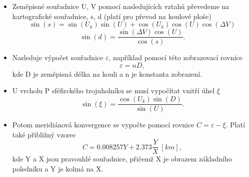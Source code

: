 \begin{itemize}
\item Zeměpisné souřadnice U, V pomocí nasledujících vztahů převedeme na kartografické souřadnice, s, d (platí pro převod na koulové ploše)
\begin{equation}
\sin{\left(s\right)} = \sin{\left(U_{k}\right)}\sin{\left(U\right)}+\cos{\left(U_{k}\right)}\cos{\left(U\right)}\cos{\left(\Delta V\right)}
\end{equation}
\begin{equation}
\sin{\left(d\right)}=\dfrac{\sin{\left(\Delta V\right)}\cos{\left(U\right)}}{\cos{\left(s\right)}}.
\end{equation}
\item Nasleduje výpočet souřadnice $\varepsilon$, například pomocí této zobrazovací rovnice
\begin{equation}
\varepsilon = nD,
\end{equation}
kde D je zeměpisná délka na kouli a n je konstanta zobrazení.
\item U vrcholu P sféfirckého trojuholníku se musí vypočítat vnitří úhel $\xi$
\begin{equation}
\sin{\left(\xi\right)} = \dfrac{\cos{\left(U_{k}\right)}\sin{\left(D\right)}}{\sin{\left(U\right)}}.
\end{equation}
\item Potom meridiánová konvergence se vypočte pomocí rovnice $C = \varepsilon - \xi$. Platí také přibližný vzorec
\begin{equation}
C = 0.008257 Y + 2.373\dfrac{Y}{X}\ [km],
\end{equation}
kde Y a X jsou pravouhlé souřadnice, přičemž X je obrazem základního poledníku a Y je kolmá na X.
\end{itemize}